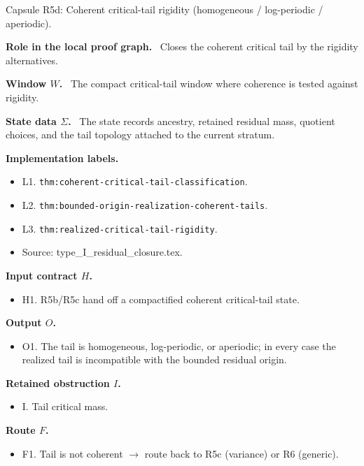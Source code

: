 \documentclass[11pt]{amsart}
\newcommand{\capsulefield}[1]{\par\smallskip\noindent\textbf{#1.}\ }
\begin{document}
\begin{proofcapsule}{Capsule R5d: Coherent critical-tail rigidity (homogeneous / log-periodic / aperiodic).}
  \capsulefield{Role in the local proof graph}
  Closes the coherent critical tail by the rigidity alternatives.

  \capsulefield{Window \(W\)}
The compact critical-tail window where coherence is tested against rigidity.

  \capsulefield{State data \(\Sigma\)}
The state records ancestry, retained residual mass, quotient choices, and the tail topology attached to the current stratum.

  \capsulefield{Implementation labels}
  \begin{itemize}[leftmargin=1.8em]
  \item L1. \texttt{thm:coherent-critical-tail-classification}.
  \item L2. \texttt{thm:bounded-origin-realization-coherent-tails}.
  \item L3. \texttt{thm:realized-critical-tail-rigidity}.
  \item Source: type\_I\_residual\_closure.tex.
  \end{itemize}

  \capsulefield{Input contract \(H\)}
  \begin{itemize}[leftmargin=1.8em]
  \item H1. R5b/R5c hand off a compactified coherent critical-tail state.
  \end{itemize}

  \capsulefield{Output \(O\)}
  \begin{itemize}[leftmargin=1.8em]
  \item O1. The tail is homogeneous, log-periodic, or aperiodic; in every case the realized tail is incompatible with the bounded residual origin.
  \end{itemize}

  \capsulefield{Retained obstruction \(I\)}
  \begin{itemize}[leftmargin=1.8em]
  \item I. Tail critical mass.
  \end{itemize}

  \capsulefield{Route \(F\)}
  \begin{itemize}[leftmargin=1.8em]
  \item F1. Tail is not coherent $\to$ route back to R5c (variance) or R6 (generic).
  \end{itemize}


\end{proofcapsule}
\end{document}
